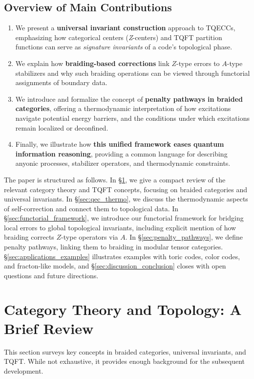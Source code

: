 \documentclass[12pt]{article}
\begin{document}
\subsection{Overview of Main Contributions}
\begin{enumerate}
    \item We present a \textbf{universal invariant construction} approach to TQECCs, emphasizing how categorical centers (\emph{Z}-centers) and TQFT partition functions can serve as \emph{signature invariants} of a code’s topological phase.
    \item We explain how \textbf{braiding-based corrections} link $Z$-type errors to $A$-type stabilizers and why such braiding operations can be viewed through functorial assignments of boundary data.
    \item We introduce and formalize the concept of \textbf{penalty pathways in braided categories}, offering a thermodynamic interpretation of how excitations navigate potential energy barriers, and the conditions under which excitations remain localized or deconfined.
    \item Finally, we illustrate how \textbf{this unified framework eases quantum information reasoning}, providing a common language for describing anyonic processes, stabilizer operators, and thermodynamic constraints.
\end{enumerate}

The paper is structured as follows. In \S\ref{sec:cat_top_review}, we give a compact review of the relevant category theory and TQFT concepts, focusing on braided categories and universal invariants. In \S\ref{sec:qec_thermo}, we discuss the thermodynamic aspects of self-correction and connect them to topological data. In \S\ref{sec:functorial_framework}, we introduce our functorial framework for bridging local errors to global topological invariants, including explicit mention of how braiding corrects $Z$-type operators via $A$. In \S\ref{sec:penalty_pathways}, we define penalty pathways, linking them to braiding in modular tensor categories. \S\ref{sec:applications_examples} illustrates examples with toric codes, color codes, and fracton-like models, and \S\ref{sec:discussion_conclusion} closes with open questions and future directions.

\section{Category Theory and Topology: A Brief Review}\label{sec:cat_top_review}
This section surveys key concepts in braided categories, universal invariants, and TQFT. While not exhaustive, it provides enough background for the subsequent development.
\end{document}
